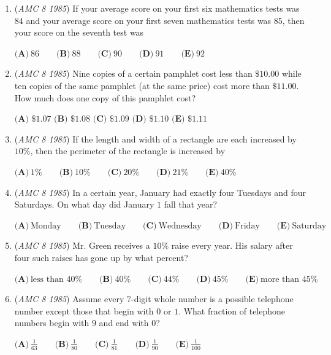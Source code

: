 \begin{enumerate}
	\item (\textit{AMC 8 1985}) If your average score on your first six mathematics tests was $84$ and your average score on your first seven mathematics tests was $85$, then your score on the seventh test was


 $\textbf{(A)}\ 86 \qquad \textbf{(B)}\ 88 \qquad \textbf{(C)}\ 90 \qquad \textbf{(D)}\ 91 \qquad \textbf{(E)}\ 92$


	\item (\textit{AMC 8 1985}) Nine copies of a certain pamphlet cost less than $\$10.00$ while ten copies of the same pamphlet (at the same price) cost more than $\$11.00$.  How much does one copy of this pamphlet cost?


 $\textbf{(A)}$ $\$1.07$
$\textbf{(B)}$ $\$1.08$
$\textbf{(C)}$ $\$1.09$
$\textbf{(D)}$ $\$1.10$
$\textbf{(E)}$ $\$1.11$


	\item (\textit{AMC 8 1985}) If the length and width of a rectangle are each increased by $10\%$, then the perimeter of the rectangle is increased by


 $\textbf{(A)}\ 1\% \qquad \textbf{(B)}\ 10\% \qquad \textbf{(C)}\ 20\% \qquad \textbf{(D)}\ 21\% \qquad \textbf{(E)}\ 40\%$


	\item (\textit{AMC 8 1985}) In a certain year, January had exactly four Tuesdays and four Saturdays.  On what day did January $1$ fall that year?


 $\textbf{(A)}\ \text{Monday} \qquad \textbf{(B)}\ \text{Tuesday} \qquad \textbf{(C)}\ \text{Wednesday} \qquad \textbf{(D)}\ \text{Friday} \qquad \textbf{(E)}\ \text{Saturday}$


	\item (\textit{AMC 8 1985}) Mr. Green receives a $10\%$ raise every year.  His salary after four such raises has gone up by what percent?


 $\textbf{(A)}\ \text{less than }40\% \qquad \textbf{(B)}\ 40\% \qquad \textbf{(C)}\ 44\% \qquad \textbf{(D)}\ 45\% \qquad \textbf{(E)}\ \text{more than }45\%$


	\item (\textit{AMC 8 1985}) Assume every 7-digit whole number is a possible telephone number except those that begin with $0$ or $1$.  What fraction of telephone numbers begin with $9$ and end with $0$?


 $\textbf{(A)}\ \frac{1}{63} \qquad \textbf{(B)}\ \frac{1}{80} \qquad \textbf{(C)}\ \frac{1}{81} \qquad \textbf{(D)}\ \frac{1}{90} \qquad \textbf{(E)}\ \frac{1}{100}$



\end{enumerate}
